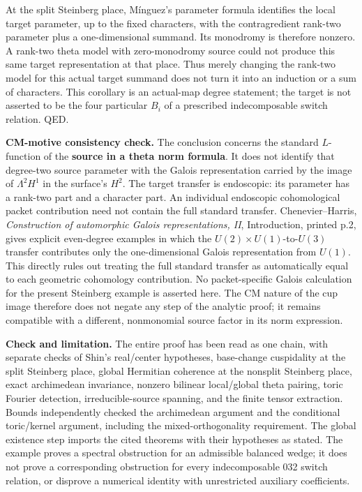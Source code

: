 At the split Steinberg place, Mínguez's parameter formula identifies the local target parameter, up to the fixed characters, with the contragredient rank-two parameter plus a one-dimensional summand. Its monodromy is therefore nonzero. A rank-two theta model with zero-monodromy source could not produce this same target representation at that place. Thus merely changing the rank-two model for this actual target summand does not turn it into an induction or a sum of characters. This corollary is an actual-map degree statement; the target is not asserted to be the four particular \(B_i\) of a prescribed indecomposable switch relation. QED.

\textbf{CM-motive consistency check.} The conclusion concerns the standard \(L\)-function of the \textbf{source in a theta norm formula}. It does not identify that degree-two source parameter with the Galois representation carried by the image of \(\Lambda^2H^1\) in the surface's \(H^2\). The target transfer is endoscopic: its parameter has a rank-two part and a character part. An individual endoscopic cohomological packet contribution need not contain the full standard transfer. Chenevier--Harris, \emph{Construction of automorphic Galois representations, II}, Introduction, printed p.2, gives explicit even-degree examples in which the \(U(2)\times U(1)\)-to-\(U(3)\) transfer contributes only the one-dimensional Galois representation from \(U(1)\). This directly rules out treating the full standard transfer as automatically equal to each geometric cohomology contribution. No packet-specific Galois calculation for the present Steinberg example is asserted here. The CM nature of the cup image therefore does not negate any step of the analytic proof; it remains compatible with a different, nonmonomial source factor in its norm expression.

\textbf{Check and limitation.} The entire proof has been read as one chain, with separate checks of Shin's real/center hypotheses, base-change cuspidality at the split Steinberg place, global Hermitian coherence at the nonsplit Steinberg place, exact archimedean invariance, nonzero bilinear local/global theta pairing, toric Fourier detection, irreducible-source spanning, and the finite tensor extraction. Bounds independently checked the archimedean argument and the conditional toric/kernel argument, including the mixed-orthogonality requirement. The global existence step imports the cited theorems with their hypotheses as stated. The example proves a spectral obstruction for an admissible balanced wedge; it does not prove a corresponding obstruction for every indecomposable 032 switch relation, or disprove a numerical identity with unrestricted auxiliary coefficients.
